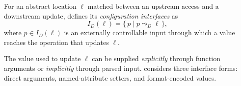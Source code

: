 \begin{center}
    \setlength{\fboxsep}{0.4em}
    \noindent{}
\end{center}


For an abstract location $\ell$ matched between an upstream access and a downstream update, \sys defines
its \textit{configuration interfaces} as
\[
I_D(\ell)
=
\{\,p \mid p \leadsto_D \ell\,\},
\]
where $p \in I_D(\ell)$ is an externally controllable input through
which a value reaches the operation that updates $\ell$.


The value used to update $\ell$ can be supplied \textit{explicitly} through function arguments or \textit{implicitly} through parsed input. \sys considers three interface forms: direct arguments, named-attribute setters, and format-encoded values.





